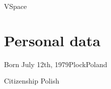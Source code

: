 %
%
%
%


    {VSpace}

\section{Personal data}

\cventry
    {Born}
    {July 12th, 1979}{Plock}{Poland}{}{}

\cventry
    {Citizenship}
    {Polish}{}{}{}{}
